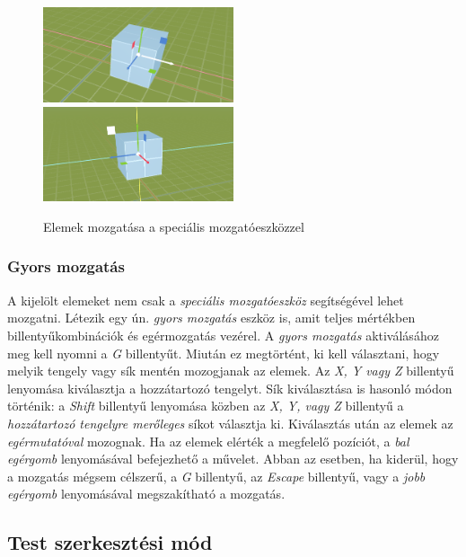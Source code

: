 \begin{figure}[H]
    \centering
    \includegraphics[width=0.5\textwidth]{parts/user-documentation/editor/images/move_in_action.png}
    \includegraphics[width=0.5\textwidth]{parts/user-documentation/editor/images/move_in_action_plane.png}
    \caption{Elemek mozgatása a speciális mozgatóeszközzel}
\end{figure}

\subsubsection{Gyors mozgatás}

A kijelölt elemeket nem csak a \emph{speciális mozgatóeszköz} segítségével lehet mozgatni. Létezik
egy ún. \emph{gyors mozgatás} eszköz is, amit teljes mértékben billentyűkombinációk és egérmozgatás
vezérel. A \emph{gyors mozgatás} aktiválásához meg kell nyomni a \emph{G} billentyűt. Miután ez
megtörtént, ki kell választani, hogy melyik tengely vagy sík mentén mozogjanak az elemek. Az
\emph{X, Y vagy Z} billentyű lenyomása kiválasztja a hozzátartozó tengelyt. Sík kiválasztása is
hasonló módon történik: a \emph{Shift} billentyű lenyomása közben az \emph{X, Y, vagy Z} billentyű
a \emph{hozzátartozó tengelyre merőleges} síkot választja ki. Kiválasztás után az elemek az
\emph{egérmutatóval} mozognak. Ha az elemek elérték a megfelelő pozíciót, a \emph{bal egérgomb}
lenyomásával befejezhető a művelet. Abban az esetben, ha kiderül, hogy a mozgatás mégsem célszerű,
a \emph{G} billentyű, az \emph{Escape} billentyű, vagy a \emph{jobb egérgomb} lenyomásával megszakítható a mozgatás.

\subsection{Test szerkesztési mód}

